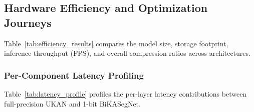 \documentclass[a4paper]{report}
\begin{document}
\subsection{Hardware Efficiency and Optimization Journeys}
\label{sec:efficiency}

Table~\ref{tab:efficiency_results} compares the model size, storage footprint, inference throughput (FPS), and overall compression ratios across architectures.

\begin{table}[h!]
\centering
\caption{Model efficiency comparison: parameter count, storage size, inference throughput, and compression ratio.}
\label{tab:efficiency_results}
\end{table}

\subsubsection{Per-Component Latency Profiling}
Table~\ref{tab:latency_profile} profiles the per-layer latency contributions between full-precision UKAN and 1-bit BiKASegNet.
\end{document}
